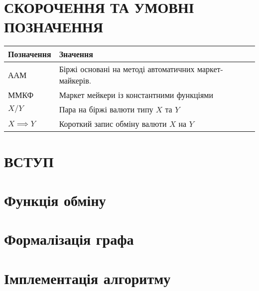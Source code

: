\documentclass[14pt]{extarticle}
\begin{document}
\newpage

\renewcommand{\contentsname}{ЗМІСТ}
\setcounter{tocdepth}{2}
\tableofcontents
\newpage

\section*{СКОРОЧЕННЯ ТА УМОВНІ ПОЗНАЧЕННЯ}\label{sec:notation}

\begin{center}
	\begin{tabular}{ll}
		Позначення       & Значення                                               \\[0pt]
		\hline{}
		ААМ              & Біржі основані на методі автоматичних маркет-майкерів. \\[0pt]
		ММКФ             & Маркет мейкери із константними функціями               \\[0pt]
		\(X/Y\)          & Пара на біржі валюти типу \(X\) та \(Y\)               \\[0pt]
		\(X \implies Y\) & Короткий запис обміну валюти \(X\) на \(Y\)            \\[0pt]
	\end{tabular}
\end{center}

\newpage

\section{ВСТУП}\label{sec:intro}


\newpage

\section{Функція обміну}\label{sec:swap-function}


\newpage

\section{Формалізація графа}\label{sec:graph}


\newpage

\section{Імплементація алгоритму}\label{sec:algorithm-impl}

\end{document}
